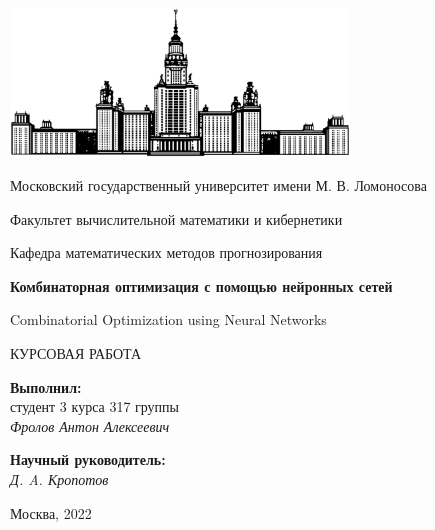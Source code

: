 \documentclass[12pt]{article}
\begin{document}
\begin{titlepage}
\begin{center}

    \includegraphics[width=9cm]{msu.eps}

    \bigskip

    Московский государственный университет имени М. В. Ломоносова

    Факультет вычислительной математики и кибернетики

    Кафедра математических методов прогнозирования

    \vspace{1.5cm}


    \vspace{1.5cm}

    \textbf{\LARGE Комбинаторная оптимизация с помощью нейронных сетей}

    \vspace{0.5cm}

    {\Large{Combinatorial Optimization using Neural Networks}}

    \vspace{1.5cm}

    {\large КУРСОВАЯ РАБОТА}

    \vspace{3cm}

    \begin{flushright}
        \parbox{0.4\textwidth}{
            \textbf{Выполнил:}\\
            студент 3 курса 317 группы\\
            \textit{Фролов Антон Алексеевич}
        }
    \end{flushright}
    
    
    \begin{flushright}
        \parbox{0.4\textwidth}{
            \textbf{Научный руководитель:}\\
            \textit{Д. A. Кропотов}
        }
    \end{flushright}

    \vspace{\fill}
    Москва, 2022
\end{center}
\end{titlepage}
\end{document}
